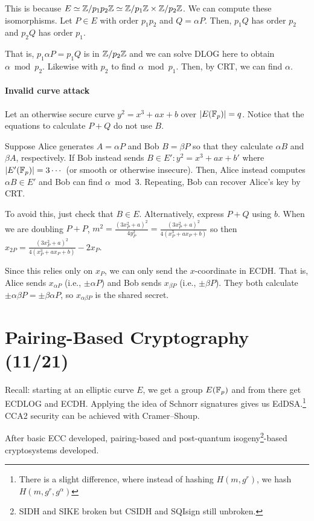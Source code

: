 \documentclass[notes]{agony}
\begin{document}
This is because $E \simeq \mathbb{Z}/p_1p_2\mathbb{Z} \simeq \mathbb{Z}/p_1\mathbb{Z} \times \mathbb{Z}/p_2\mathbb{Z}$.
We can compute these isomorphisms.
Let $P \in E$ with order $p_1p_2$ and $Q = \alpha P$.
Then, $p_1Q$ has order $p_2$ and $p_2Q$ has order $p_1$.

That is, $p_1\alpha P = p_1 Q$ is in $\mathbb{Z}/p_2\mathbb{Z}$ and we can solve DLOG here
to obtain $\alpha \bmod p_2$.
Likewise with $p_2$ to find $\alpha \bmod p_1$.
Then, by CRT, we can find $\alpha$.

\paragraph{Invalid curve attack}
Let an otherwise secure curve $y^2=x^3+ax+b$ over $\abs{E(\mathbb{F}_p)} = q$.
Notice that the equations to calculate $P + Q$ do not use $B$.

Suppose Alice generates $A = \alpha P$ and Bob $B = \beta P$
so that they calculate $\alpha B$ and $\beta A$, respectively.
If Bob instead sends $B \in E' : y^2 = x^3 + ax + b'$
where $\abs{E'(\mathbb{F}_p)} = 3 \cdots$ (or smooth or otherwise insecure).
Then, Alice instead computes $\alpha B \in E'$ and Bob can find $\alpha \bmod 3$.
Repeating, Bob can recover Alice's key by CRT.

To avoid this, just check that $B \in E$.
Alternatively, express $P+Q$ using $b$.
When we are doubling $P + P$, $m^2 = \frac{(3x_P^2 + a)^2}{4y_P^2}
  = \frac{(3x_P^2 +a)^2}{4(x_P^3 + ax_P + b)}$
so then $x_{2P} = \frac{(3x_P^2 +a)^2}{4(x_P^3 + ax_P + b)} - 2x_P$.

Since this relies only on $x_P$, we can only send the $x$-coordinate in ECDH.
That is, Alice sends $x_{\alpha P}$ (i.e., $\pm \alpha P$)
and Bob sends $x_{\beta P}$ (i.e., $\pm \beta P$).
They both calculate $\pm \alpha \beta P = \pm \beta \alpha P$,
so $x_{\alpha\beta P}$ is the shared secret.

\section{Pairing-Based Cryptography (11/21)}

Recall: starting at an elliptic curve $E$,
we get a group $E(\mathbb{F}_p)$ and from there get ECDLOG and ECDH.
Applying the idea of Schnorr signatures gives us EdDSA.\footnote{
  There is a slight difference, where instead of hashing $H(m,g^r)$, we hash $H(m,g^r,g^\alpha)$}
CCA2 security can be achieved with Cramer--Shoup.

After basic ECC developed, pairing-based
and post-quantum isogeny\footnote{
  SIDH and SIKE broken but CSIDH and SQIsign still unbroken.
}-based cryptosystems developed.
\end{document}
